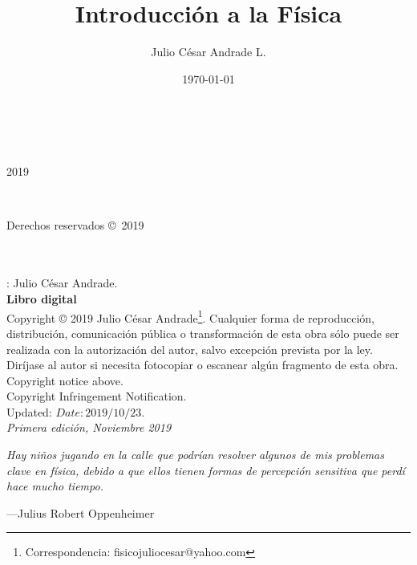 \documentclass[a4paper,pagesize,10pt,bibtotoc,pointlessnumbers,
normalheadings,DIV=9,fleqn,x11names,table,twoside=false]{scrbook}
\title{Introducción a la Física}
\author{Julio César Andrade L.}
\date{\today}
\begin{document}
%

\BgThispage
\begin{titlepage}
		\\
			
		\vspace{10mm}
		\\
		\vspace{\fill}
		\centering \large{2019}
\end{titlepage}


\newpage
~\vfill
\thispagestyle{empty}
\cleardoublepage

\noindent 
\parbox[s]{0.35\textwidth}{Derechos reservados \copyright\ 2019}\parbox[c]{0.65\textwidth}{
 \color{gray}
 } \\\\  
 
: Julio César Andrade.\\
\noindent \textbf{Libro digital}\\

\noindent  Copyright © 2019 Julio César Andrade\footnote{Correspondencia: fisicojuliocesar@yahoo.com}. 
Cualquier forma de reproducción, distribución, comunicación pública o transformación de esta obra sólo puede ser realizada con  la 
 autorización  del autor,  salvo  excepción  prevista  por  la  ley.  Diríjase  al autor si  necesita  fotocopiar  o  escanear 
algún fragmento de esta obra.\\

Copyright notice above.\\

Copyright Infringement Notification.\\

Updated: $Date: 2019/10/23$.\\

\noindent \textit{Primera edición, Noviembre 2019} 


\newpage{}
\thispagestyle {empty}

\vspace*{2cm}

\begin{center}
	\Large{\parbox{10cm}{
		\begin{raggedright}
		{\Large 
			\textit{Hay niños jugando en la calle que podrían resolver algunos de mis problemas clave en física, 
			debido a que ellos tienen formas de percepción sensitiva que perdí hace mucho tiempo.}
		}
	
		\vspace{.5cm}\hfill{---Julius Robert Oppenheimer}
		\end{raggedright}
	}
}
\end{center}
\end{document}
